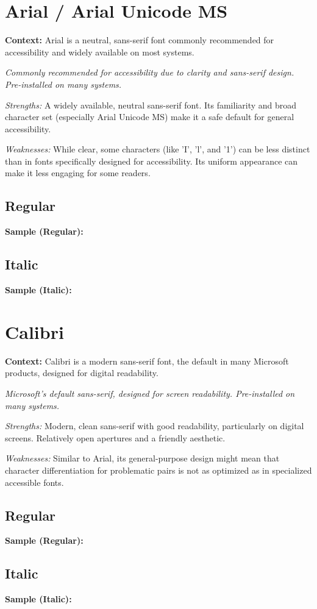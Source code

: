 \pagebreak
\section{Arial / Arial Unicode MS}\label{app5:sec:arial}
\noindent
\textbf{Context:} Arial is a neutral, sans-serif font commonly recommended for accessibility and widely available on most systems.

\emph{Commonly recommended for accessibility due to clarity and sans-serif design. Pre-installed on many systems.}
\begin{raggedright}
	\emph{Strengths:} A widely available, neutral sans-serif font. Its familiarity and broad character set (especially Arial Unicode MS) make it a safe default for general accessibility.

	\emph{Weaknesses:} While clear, some characters (like 'I', 'l', and '1') can be less distinct than in fonts specifically designed for accessibility. Its uniform appearance can make it less engaging for some readers.

	\subsection{Regular}
	\noindent\textbf{Sample (Regular):}
	\FontSample{\arialfont}

	\subsection{Italic}
	\noindent\textbf{Sample (Italic):}
	\FontSample{{\arialfont\itshape}}
\end{raggedright}


\pagebreak
\section{Calibri}\label{app5:sec:calibri}
\noindent
\textbf{Context:} Calibri is a modern sans-serif font, the default in many Microsoft products, designed for digital readability.

\emph{Microsoft’s default sans-serif, designed for screen readability. Pre-installed on many systems.}
\begin{raggedright}
	\emph{Strengths:} Modern, clean sans-serif with good readability, particularly on digital screens. Relatively open apertures and a friendly aesthetic.

	\emph{Weaknesses:} Similar to Arial, its general-purpose design might mean that character differentiation for problematic pairs is not as optimized as in specialized accessible fonts.

	\subsection{Regular}
	\noindent\textbf{Sample (Regular):}
	\FontSample{\calibrifont}

	\subsection{Italic}
	\noindent\textbf{Sample (Italic):}
	\FontSample{{\calibrifont\itshape}}
\end{raggedright}


